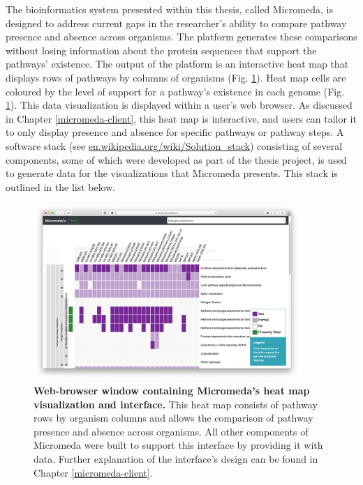 The bioinformatics system presented within this thesis, called Micromeda, is 
designed to address current gaps in the researcher's ability to compare pathway 
presence and absence across organisms. The platform generates these comparisons 
without losing information about the protein sequences that support the 
pathways' existence. The output of the platform is an interactive heat map that 
displays rows of pathways by columns of organisms (Fig. 
\ref{fig:basic-heatmap-overview}). Heat map cells are coloured by the level of 
support for a pathway's existence in each genome (Fig. 
\ref{fig:basic-heatmap-overview}). This data visualization is displayed within a 
user's web browser. As discussed in Chapter \ref{micromeda-client}, this heat 
map is interactive, and users can tailor it to only display presence and absence 
for specific pathways or pathway steps. A software stack (see 
\href{http://en.wikipedia.org/wiki/Solution_stack}{en.wikipedia.org/wiki/Solution\_stack}) 
consisting of several components, some of which were developed as part of the 
thesis project, is used to generate data for the visualizations that Micromeda 
presents. This stack is outlined in the list below.

\begin{figure}[!ht]
  \centering
	\includegraphics[width=0.9\textwidth]{media/Micromeda-Simple-Overview.png}
	 \caption[Web-browser window containing Micromeda’s heat map visualization 
and interface.] {\textbf{Web-browser window containing Micromeda’s heat map 
visualization and interface.} This heat map consists of pathway rows by organism 
columns and allows the comparison of pathway presence and absence across 
organisms. All other components of Micromeda were built to support this 
interface by providing it with data. Further explanation of the interface’s 
design can be found in Chapter \ref{micromeda-client}.}
	 \label{fig:basic-heatmap-overview}
\end{figure}

